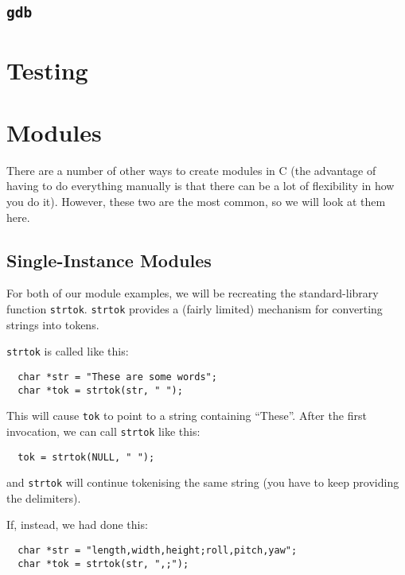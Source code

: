 \documentclass[a4paper,10pt]{article}
\newcommand{\kw}[1]{\texttt{#1}}
\newcommand{\tool}[1]{\texttt{#1}}
\begin{document}
\subsection{\tool{gdb}}



\section{Testing}



\section{Modules}

There are a number of other ways to create modules in C (the advantage
of having to do everything manually is that there can be a lot of
flexibility in how you do it). However, these two are the most common,
so we will look at them here.

\subsection{Single-Instance Modules}

For both of our module examples, we will be recreating the
standard-library function \kw{strtok}. \kw{strtok} provides a (fairly
limited) mechanism for converting strings into tokens.

\kw{strtok} is called like this:

\begin{lstlisting}
  char *str = "These are some words";
  char *tok = strtok(str, " ");
\end{lstlisting}

\noindent
This will cause \kw{tok} to point to a string containing
``These''. After the first invocation, we can call \kw{strtok} like
this:

\begin{lstlisting}
  tok = strtok(NULL, " ");
\end{lstlisting}

\noindent
and \kw{strtok} will continue tokenising the same string (you have to
keep providing the delimiters).

If, instead, we had done this:

\begin{lstlisting}
  char *str = "length,width,height;roll,pitch,yaw";
  char *tok = strtok(str, ",;");
\end{lstlisting}
\end{document}
